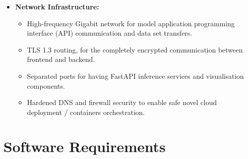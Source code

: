\documentclass[12pt,a4]{report}
\begin{document}
\begin{itemize}
\item \textbf{Network Infrastructure:}
\begin{itemize}
\item High-frequency Gigabit network for model application programming interface (API) communication and data set transfers.
\item TLS 1.3 routing, for the completely encrypted communication between frontend and backend.
\item Separated ports for having FastAPI inference services and visualisation components.
\item Hardened DNS and firewall security to enable safe novel cloud deployment / containers orchestration.
\end{itemize}
\end{itemize}

\vspace{0.5cm}
\section{Software Requirements}
\end{document}
